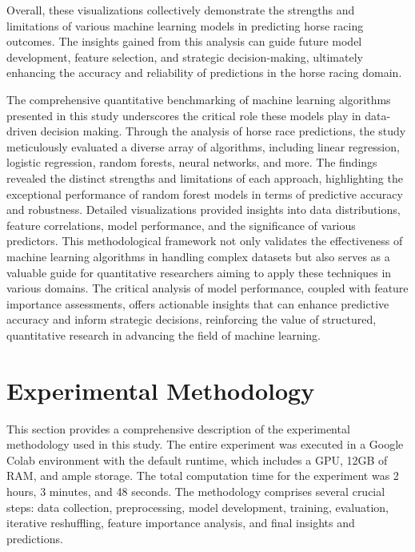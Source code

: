 \documentclass{article}
\begin{document}
Overall, these visualizations collectively demonstrate the strengths and limitations of various machine learning models in predicting horse racing outcomes. The insights gained from this analysis can guide future model development, feature selection, and strategic decision-making, ultimately enhancing the accuracy and reliability of predictions in the horse racing domain.

The comprehensive quantitative benchmarking of machine learning algorithms presented in this study underscores the critical role these models play in data-driven decision making. Through the analysis of horse race predictions, the study meticulously evaluated a diverse array of algorithms, including linear regression, logistic regression, random forests, neural networks, and more. The findings revealed the distinct strengths and limitations of each approach, highlighting the exceptional performance of random forest models in terms of predictive accuracy and robustness. Detailed visualizations provided insights into data distributions, feature correlations, model performance, and the significance of various predictors. This methodological framework not only validates the effectiveness of machine learning algorithms in handling complex datasets but also serves as a valuable guide for quantitative researchers aiming to apply these techniques in various domains. The critical analysis of model performance, coupled with feature importance assessments, offers actionable insights that can enhance predictive accuracy and inform strategic decisions, reinforcing the value of structured, quantitative research in advancing the field of machine learning.

\section*{Experimental Methodology}

This section provides a comprehensive description of the experimental methodology used in this study. The entire experiment was executed in a Google Colab environment with the default runtime, which includes a GPU, 12GB of RAM, and ample storage. The total computation time for the experiment was 2 hours, 3 minutes, and 48 seconds. The methodology comprises several crucial steps: data collection, preprocessing, model development, training, evaluation, iterative reshuffling, feature importance analysis, and final insights and predictions.
\end{document}
